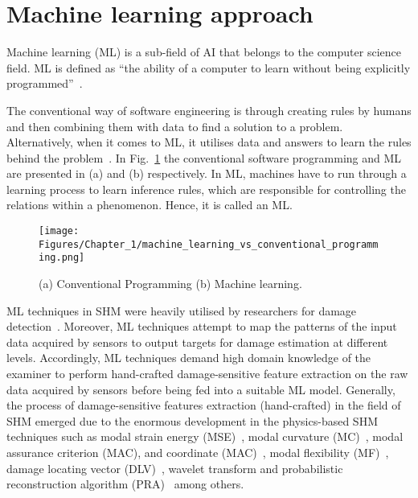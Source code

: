 \section{Machine learning approach}
\label{sec31}
Machine learning (ML) is a sub-field of AI that belongs to the computer science field.
ML is defined as \enquote{the ability of a computer to learn without being explicitly programmed}~\cite{munoz2014machine}.

The conventional way of software engineering is through creating rules by humans and then combining them with data to find a solution to a problem.
Alternatively, when it comes to ML, it utilises data and answers to learn the rules behind the problem~\cite{franoischollet2017learning}.
In Fig.~\ref{fig:Machine_learning} the conventional software programming and ML are presented in (a) and (b) respectively.
In ML, machines have to run through a learning process to learn inference rules, which are responsible for controlling the relations within a phenomenon. 
Hence, it is called an ML.
\begin{figure} [!ht]
	\begin{center}
		\centering
		\texttt{[image: Figures/Chapter\_1/machine\_learning\_vs\_conventional\_programming.png]}
	\end{center}
	\caption{(a) Conventional Programming	(b) Machine learning.} 
	\label{fig:Machine_learning}
\end{figure}

ML techniques in SHM were heavily utilised by researchers for damage detection~\cite{raghavan2008effects, Su2009, Mitra2016}.
Moreover, ML techniques attempt to map the patterns of the input data acquired by sensors to output targets for damage estimation at different levels.
Accordingly, ML techniques demand high domain knowledge of the examiner to perform hand-crafted damage-sensitive feature extraction on the raw data acquired by sensors before being fed into a suitable ML model.
Generally, the process of damage-sensitive features extraction (hand-crafted) in the field of SHM emerged due to the enormous development in the physics-based SHM techniques such as modal strain energy (MSE)~\cite{Kim}, modal curvature (MC)~\cite{Wahab}, modal assurance criterion (MAC), and coordinate (MAC)~\cite{Allemang2003}, modal flexibility (MF)~\cite{Jaishi}, damage locating vector (DLV)~\cite{Bernal2002}, wavelet transform \cite{Staszewski, Kima} and probabilistic reconstruction algorithm (PRA)~\cite{Hay2006} among others.

